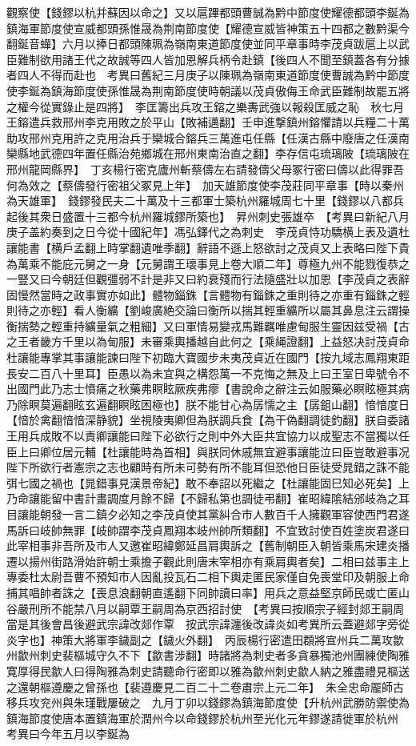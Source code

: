 觀察使【錢鏐以杭并蘇因以命之】又以扈蹕都頭曹誠為黔中節度使耀德都頭李鋋為鎮海軍節度使宣威都頭孫惟晟為荆南節度使【耀德宣威皆神策五十四都之數黔渠今翻鋋音蟬】六月以捧日都頭陳珮為嶺南東道節度使並同平章事時李茂貞跋扈上以武臣難制欲用諸王代之故誠等四人皆加恩解兵柄令赴鎮【後四人不聞至鎮蓋各有分據者四人不得而赴也　考異曰舊紀三月庚子以陳珮為嶺南東道節度使曹誠為黔中節度使李鋋為鎮海節度使孫惟晟為荆南節度使時朝議以茂貞傲侮王命武臣難制故罷五將之權今從實錄止是四將】　李匡籌出兵攻王鎔之樂夀武強以報殺匡威之恥　秋七月王鎔遣兵救邢州李克用敗之於平山【敗補邁翻】壬申進撃鎮州鎔懼請以兵糧二十萬助攻邢州克用許之克用治兵于欒城合鎔兵三萬進屯任縣【任漢古縣中廢唐之任漢南欒縣地武德四年置任縣治苑鄉城在邢州東南治直之翻】李存信屯琉璃陂【琉璃陂在邢州龍岡縣界】　丁亥楊行密克廬州斬蔡儔左右請發儔父母冢行密曰儔以此得罪吾何為效之【蔡儔發行密祖父冢見上年】　加天雄節度使李茂莊同平章事【時以秦州為天雄軍】　錢鏐發民夫二十萬及十三都軍士築杭州羅城周七十里【錢鏐以八都兵起後其衆日盛置十三都今杭州羅城鏐所築也】　昇州刺史張雄卒　【考異曰新紀八月庚子盖約奏到之日今從十國紀年】馮弘鐸代之為刺史　李茂貞恃功驕横上表及遺杜讓能書【横戶孟翻上時掌翻遺唯季翻】辭語不遜上怒欲討之茂貞又上表略曰陛下貴為萬乘不能庇元舅之一身【元舅謂王瓌事見上卷大順二年】尊極九州不能戮復恭之一豎又曰今朝廷但觀彊弱不計是非又曰約衰殘而行法隨盛壯以加恩【李茂貞之表辭固慢然當時之政事實亦如此】體物錙銖【言體物有錙銖之重則待之亦重有錙銖之輕則待之亦輕】看人衡纊【劉峻廣絶交論曰衡所以揣其輕重纊所以屬其鼻息注云謂操衡揣勢之輕重持纊量氣之粗細】又曰軍情易變戎馬難羈唯慮甸服生靈因兹受禍【古之王者畿方千里以為甸服】未審乘輿播越自此何之【乘䋲證翻】上益怒决討茂貞命杜讓能專掌其事讓能諫曰陛下初臨大寶國步未夷茂貞近在國門【按九域志鳳翔東距長安二百八十里耳】臣愚以為未宜與之構怨萬一不克悔之無及上曰王室日卑號令不出國門此乃志士憤痛之秋藥弗瞑眩厥疾弗瘳【書說命之辭注云如服藥必瞑眩極其病乃除瞑莫遍翻眩玄遍翻瞑眩困極也】朕不能甘心為孱懦之主【孱鉏山翻】愔愔度日【愔於禽翻愔愔深静貌】坐視陵夷卿但為朕調兵食【為干偽翻調徒釣翻】朕自委諸王用兵成敗不以責卿讓能曰陛下必欲行之則中外大臣共宜協力以成聖志不當獨以任臣上曰卿位居元輔【杜讓能時為首相】與朕同休戚無宜避事讓能泣曰臣豈敢避事况陛下所欲行者憲宗之志也顧時有所未可勢有所不能耳但恐他日臣徒受晁錯之誅不能弭七國之禍也【晁錯事見漢景帝紀】敢不奉詔以死繼之【杜讓能固巳知必死矣】上乃命讓能留中書計畫調度月餘不歸【不歸私第也調徒弔翻】崔昭緯隂結邠岐為之耳目讓能朝發一言二鎮夕必知之李茂貞使其黨糾合市人數百千人擁觀軍容使西門君遂馬訴曰岐帥無罪【岐帥謂李茂貞鳳翔本岐州帥所類翻】不宜致討使百姓塗炭君遂曰此宰相事非吾所及市人又邀崔昭緯鄭延昌肩輿訴之【舊制朝臣入朝皆乘馬宋建炎播遷以揚州街路滑始許朝士乘擔子觀此則唐末宰相亦有乘肩輿者矣】二相曰兹事主上專委杜太尉吾曹不預知市人因亂投瓦石二相下輿走匿民家僅自免喪堂印及朝服上命捕其唱帥者誅之【喪息浪翻朝直遙翻下同帥讀曰率】用兵之意益堅京師民或亡匿山谷嚴刑所不能禁八月以嗣覃王嗣周為京西招討使　【考異曰按順宗子經封郯王嗣周當是其後會昌後避武宗諱改郯作覃　按武宗諱瀍後改諱炎如考異所云蓋避郯字旁從炎字也】神策大將軍李鐬副之【鐬火外翻】　丙辰楊行密遣田頵將宣州兵二萬攻歙州歙州刺史裴樞城守久不下【歙書涉翻】時諸將為刺史者多貪暴獨池州團練使陶雅寛厚得民歙人曰得陶雅為刺史請聽命行密即以雅為歙州刺史歙人納之雅盡禮見樞送之還朝樞遵慶之曾孫也【裴遵慶見二百二十二卷肅宗上元二年】　朱全忠命龎師古移兵攻兖州與朱瑾戰屢破之　九月丁卯以錢鏐為鎮海節度使【升杭州武勝防禦使為鎮海節度使唐本置鎮海軍於潤州今以命錢鏐於杭州至光化元年鏐遂請徙軍於杭州　考異曰今年五月以李鋋為